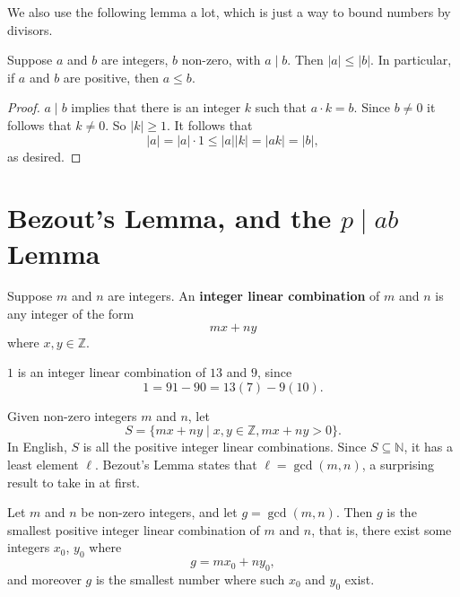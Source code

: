 We also use the following lemma a lot, which is just a way to bound numbers by divisors.
\begin{lemma}
    Suppose $a$ and $b$ are integers, $b$ non-zero, with $a \mid b$. Then $|a| \leq |b|$. In particular, if $a$ and $b$ are positive, then $a \leq b$.
\end{lemma}
\begin{proof}
    $a \mid b$ implies that there is an integer $k$ such that $a\cdot k = b$. Since $b \neq 0$ it follows that $k \neq 0$. So $|k| \geq 1$. It follows that 
    \[|a| = |a| \cdot 1 \leq |a||k| = |ak| = |b|,\] as desired.
\end{proof}

\section{Bezout's Lemma, and the $p \mid ab$ Lemma}

\begin{definition}
 Suppose $m$ and $n$ are integers. An \textbf{integer linear combination} of $m$ and $n$ is any integer of the form 
 \[mx + ny\] where $x, y \in \mathbb{Z}$.
\end{definition}

\begin{example}
    $1$ is an integer linear combination of $13$ and $9$, since
    \[1 = 91 - 90 = 13(7) - 9(10).\]
\end{example}

Given non-zero integers $m$ and $n$, let \[S = \{mx + ny \mid x, y \in \mathbb{Z}, mx + ny > 0\}.\]
In English, $S$ is all the positive integer linear combinations. Since $S \subseteq \mathbb{N}$, it has a least element $\ell$. Bezout's Lemma states that $\ell = \gcd(m, n)$, a surprising result to take in at first.

\begin{lemma}
    Let $m$ and $n$ be non-zero integers, and let $g = \gcd(m, n)$. Then $g$ is the smallest positive integer linear combination of $m$ and $n$, that is, there exist some integers $x_0$, $y_0$ where
    \[g = mx_0 + ny_0,\] and moreover $g$ is the smallest number where such $x_0$ and $y_0$ exist.
\end{lemma}

